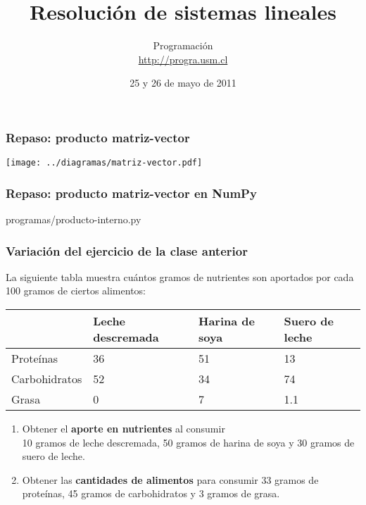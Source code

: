 \documentclass[12pt]{beamer}
\title{Resolución de sistemas lineales}
\author{
  Programación \\ \url{http://progra.usm.cl}
}
\date{25 y 26 de mayo de 2011}
\begin{document}
  \begin{frame}
    \maketitle
  \end{frame}

  \begin{frame}
    \label{producto-matriz-vector}
    \frametitle{Repaso: producto matriz-vector}
    \texttt{[image: ../diagramas/matriz-vector.pdf]}
  \end{frame}

  \begin{frame}
    \label{producto-matriz-vector-numpy}
    \frametitle{Repaso: producto matriz-vector en NumPy}
    
        {programas/producto-interno.py}
  \end{frame}

  \begin{frame}
    \label{ejercicio-nutrientes}
    \frametitle{Variación del ejercicio de la clase anterior}
    La siguiente tabla muestra cuántos gramos de nutrientes
    son aportados por cada 100 gramos de ciertos alimentos:
    \vspace{2ex}

    {\footnotesize
    \begin{tabular}{lp{6em}p{6em}p{4.5em}}
      & \raggedright Leche descremada & \raggedright Harina de soya & {\raggedright Suero de leche} \\\hline
      Proteínas     &  36 &   51 &   13  \\\hline
      Carbohidratos &  52 &   34 &   74  \\\hline
      Grasa         &   0 &    7 &  1.1  \\\hline
    \end{tabular}}

    \begin{enumerate}
      \vspace{2ex}
      \item
        Obtener el \textbf{aporte en nutrientes} al consumir \\
        10 gramos de leche descremada,
        50 gramos de harina de soya y
        30 gramos de suero de leche.
      \vspace{2ex}
      \item
        Obtener las \textbf{cantidades de alimentos} para consumir
        33 gramos de proteínas,
        45 gramos de carbohidratos y
        3 gramos de grasa.
    \end{enumerate}
  \end{frame}
\end{document}

